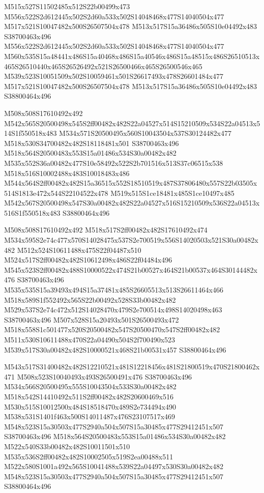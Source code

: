 \documentclass{article}
\begin{document}
\begin{multicols}{2}
M515x527S11502485x512S22b00499x473 M556x522S2d612445x502S2d60a533x502S14048468x477S14040504x477 M517x521S10047482x500S26507504x478 M513x517S15a36486x505S10e04492x483 S38700463x496 M556x522S2d612445x502S2d60a533x502S14048468x477S14040504x477 M560x535S15a48441x486S15a40468x486S15a40546x486S15a48515x486S26510513x465S26510440x465S26526492x521S26500466x465S26500546x465 M539x523S10051509x502S10059461x501S26617493x478S26601484x477 M517x521S10047482x500S26507504x478 M513x517S15a36486x505S10e04492x483 S38800464x496

M508x508S17610492x492 M542x565S20500498x545S2ff00482x482S22a04527x514S15210509x534S22a04513x514S1f550518x483 M534x571S20500495x560S10043504x537S30124482x477 M518x530S34700482x482S18118481x501 S38700463x496 M518x564S20500483x553S15a01486x534S30a00482x482 M535x552S36a00482x477S10e58492x522S2b701516x513S37c06515x538 M518x516S10002488x483S10018483x486 M544x564S2ff00482x482S15a36515x552S18510519x487S37806480x557S22b03505x514S1813e472x544S22104522x478 M519x515S1ce18481x485S1ce10497x485 M542x567S20500498x547S30a00482x482S22a04527x516S15210509x536S22a04513x516S1f550518x483 S38800464x496


M508x508S17610492x492 M518x517S2ff00482x482S17610492x474 M534x595S2e74c477x570S14028475x537S2e700519x556S14020503x521S30a00482x482 M512x524S10611488x475S22f04487x510 M524x517S2ff00482x482S10612498x486S22f04484x496 M545x523S2ff00482x488S10000522x474S21b00527x464S21b00537x464S30144482x476 S38700463x496 M535x535S15a39493x494S15a37481x485S26605513x513S26611464x466 M518x589S1f552492x565S22b00492x528S33b00482x482 M529x537S2e74c472x512S14028470x479S2e700514x498S14020498x463 S38700463x496 M507x528S15a20493x501S26500493x472 M518x558S1c501477x520S20500482x547S20500470x547S2ff00482x482 M511x530S10611488x470S22a04490x504S2f700490x523 M539x517S30a00482x482S10000521x468S21b00531x457 S38800464x496

M543x517S31400482x482S12210521x481S12218456x481S21800519x470S21800462x471 M508x523S10040493x493S26500491x476 S38700463x496 M534x566S20500495x555S10043504x533S30a00482x482 M518x542S14410492x511S2ff00482x482S20600469x516 M530x515S10012500x484S18518470x489S2e734494x490 M538x531S1401f463x500S14011487x476S23107517x469 M548x523S15a30503x477S2940a504x507S15a30485x477S29412451x507 S38700463x496 M518x564S20500483x553S15a01486x534S30a00482x482 M522x540S33b00482x482S10011501x510 M535x536S2ff00482x482S10002505x519S2ea00488x511 M522x580S1001a492x565S10041488x539S22a04497x530S30a00482x482 M548x523S15a30503x477S2940a504x507S15a30485x477S29412451x507 S38800464x496


\end{multicols}
\end{document}
